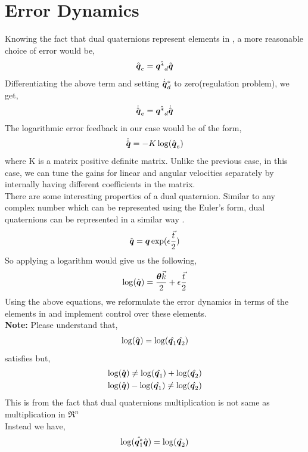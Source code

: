\documentclass[a4paper,12pt]{article}
\begin{document}
\section{Error Dynamics}
Knowing the fact that dual quaternions represent elements in \SE, a more reasonable choice of error would be, 
\begin{align}
	\hat{\boldsymbol{q}}_e = \hat{{\boldsymbol{q}^*}_d} \hat{\boldsymbol{q}}
\end{align}
Differentiating the above term and setting $\dot{\hat{\boldsymbol{q}}}^*_d$ to zero(regulation problem), we get,
\begin{align}
	\dot{\hat{\boldsymbol{q}}}_e = \hat{{\boldsymbol{q}^*}_d} \dot{\hat{\boldsymbol{q}}}
\end{align}
The logarithmic error feedback in our case would be of the form,
\begin{align}
	\dot{\hat{\boldsymbol{q}}} = -K \log(\hat{\boldsymbol{q}}_e)
\end{align}
where K is a matrix positive definite matrix. Unlike the previous case, in this case, we can tune the gains for linear and angular velocities separately by internally having different coefficients in the matrix.\\
There are some interesting properties of a dual quaternion. Similar to any complex number which can be represented using the Euler's form, dual quaternions can be represented in a similar way \cite{bottema1979theoretical}.
\begin{align}
	\hat{\boldsymbol{q}} = \boldsymbol{q} \exp(\epsilon \frac{\vec{t}}{2})
\end{align}
So applying a logarithm would give us the following, 
\begin{align}
	\log(\hat{\boldsymbol{q}}) = \frac{\boldsymbol{\theta} \vec{k}}{2} + \epsilon \frac{\vec{t}}{2}
\end{align}
Using the above equations, we reformulate the error dynamics in terms of the elements in \se and implement control over these elements.\\
{\bf Note:} Please understand that,
\begin{align}
	\log(\hat{\boldsymbol{q}}) = \log(\hat{\boldsymbol{q}_1}\hat{\boldsymbol{q}_2})
\end{align}
satisfies but, 
\begin{align}
	\log(\hat{\boldsymbol{q}}) \neq \log(\hat{\boldsymbol{q}_1})+\log(\hat{\boldsymbol{q}_2})\\
	\log(\hat{\boldsymbol{q}})-\log(\hat{\boldsymbol{q}_1}) \neq \log(\hat{\boldsymbol{q}_2})
\end{align}
This is from the fact that dual quaternions multiplication is not same as multiplication in $\Re^n$\\
Instead we have, 
\begin{align}
	\log(\hat{\boldsymbol{q}^*_1} \hat{\boldsymbol{q}}) = \log(\hat{\boldsymbol{q}_2})
\end{align}
\end{document}
